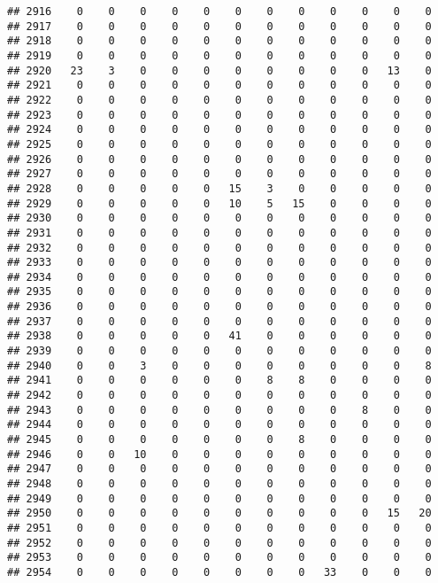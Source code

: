 \documentclass[]{article}
\begin{document}
\begin{verbatim}
## 2916    0    0    0    0    0    0    0    0    0    0    0    0
## 2917    0    0    0    0    0    0    0    0    0    0    0    0
## 2918    0    0    0    0    0    0    0    0    0    0    0    0
## 2919    0    0    0    0    0    0    0    0    0    0    0    0
## 2920   23    3    0    0    0    0    0    0    0    0   13    0
## 2921    0    0    0    0    0    0    0    0    0    0    0    0
## 2922    0    0    0    0    0    0    0    0    0    0    0    0
## 2923    0    0    0    0    0    0    0    0    0    0    0    0
## 2924    0    0    0    0    0    0    0    0    0    0    0    0
## 2925    0    0    0    0    0    0    0    0    0    0    0    0
## 2926    0    0    0    0    0    0    0    0    0    0    0    0
## 2927    0    0    0    0    0    0    0    0    0    0    0    0
## 2928    0    0    0    0    0   15    3    0    0    0    0    0
## 2929    0    0    0    0    0   10    5   15    0    0    0    0
## 2930    0    0    0    0    0    0    0    0    0    0    0    0
## 2931    0    0    0    0    0    0    0    0    0    0    0    0
## 2932    0    0    0    0    0    0    0    0    0    0    0    0
## 2933    0    0    0    0    0    0    0    0    0    0    0    0
## 2934    0    0    0    0    0    0    0    0    0    0    0    0
## 2935    0    0    0    0    0    0    0    0    0    0    0    0
## 2936    0    0    0    0    0    0    0    0    0    0    0    0
## 2937    0    0    0    0    0    0    0    0    0    0    0    0
## 2938    0    0    0    0    0   41    0    0    0    0    0    0
## 2939    0    0    0    0    0    0    0    0    0    0    0    0
## 2940    0    0    3    0    0    0    0    0    0    0    0    8
## 2941    0    0    0    0    0    0    8    8    0    0    0    0
## 2942    0    0    0    0    0    0    0    0    0    0    0    0
## 2943    0    0    0    0    0    0    0    0    0    8    0    0
## 2944    0    0    0    0    0    0    0    0    0    0    0    0
## 2945    0    0    0    0    0    0    0    8    0    0    0    0
## 2946    0    0   10    0    0    0    0    0    0    0    0    0
## 2947    0    0    0    0    0    0    0    0    0    0    0    0
## 2948    0    0    0    0    0    0    0    0    0    0    0    0
## 2949    0    0    0    0    0    0    0    0    0    0    0    0
## 2950    0    0    0    0    0    0    0    0    0    0   15   20
## 2951    0    0    0    0    0    0    0    0    0    0    0    0
## 2952    0    0    0    0    0    0    0    0    0    0    0    0
## 2953    0    0    0    0    0    0    0    0    0    0    0    0
## 2954    0    0    0    0    0    0    0    0   33    0    0    0

\end{verbatim}
\end{document}

